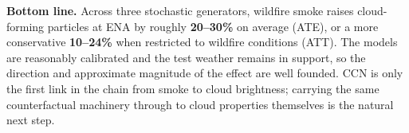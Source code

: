 \documentclass[11pt]{article}
\begin{document}
\textbf{Bottom line.} Across three stochastic generators, wildfire smoke raises
cloud-forming particles at ENA by roughly \textbf{20--30\%} on average (ATE), or a more
conservative \textbf{10--24\%} when restricted to wildfire conditions (ATT). The models are
reasonably calibrated and the test weather remains in support, so the direction and
approximate magnitude of the effect are well founded. CCN is only the first link in the
chain from smoke to cloud brightness; carrying the same counterfactual machinery through to
cloud properties themselves is the natural next step.
\end{document}
